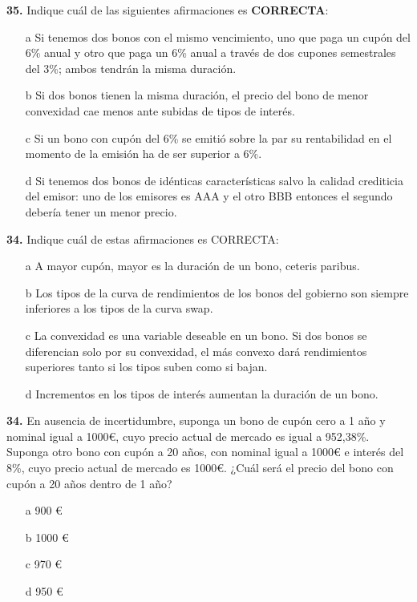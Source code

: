 \documentclass{nuevotema}
\begin{document}
\textbf{35.} Indique cuál de las siguientes afirmaciones es \textbf{CORRECTA}:
\begin{enumerate}
	\item[a] Si tenemos dos bonos con el mismo vencimiento, uno que paga un cupón del 6\% anual y otro que paga un 6\% anual a través de dos cupones semestrales del 3\%; ambos tendrán la misma duración.
	\item[b] Si dos bonos tienen la misma duración, el precio del bono de menor convexidad cae menos ante subidas de tipos de interés.
	\item[c] Si un bono con cupón del 6\% se emitió sobre la par su rentabilidad en el momento de la emisión ha de ser superior a 6\%.
	\item[d] Si tenemos dos bonos de idénticas características salvo la calidad crediticia del emisor: uno de los emisores es AAA y el otro BBB entonces el segundo debería tener un menor precio.
\end{enumerate}

\textbf{34.} Indique cuál de estas afirmaciones es CORRECTA:
\begin{enumerate}
	\item[a] A mayor cupón, mayor es la duración de un bono, ceteris paribus.
	\item[b] Los tipos de la curva de rendimientos de los bonos del gobierno son siempre inferiores a los tipos de la curva swap.
	\item[c] La convexidad es una variable deseable en un bono. Si dos bonos se diferencian solo por su convexidad, el más convexo dará rendimientos superiores tanto si los tipos suben como si bajan.
	\item[d] Incrementos en los tipos de interés aumentan la duración de un bono.
\end{enumerate}

\textbf{34.} En ausencia de incertidumbre, suponga un bono de cupón cero a 1 año y nominal igual a 1000€, cuyo precio actual de mercado es igual a 952,38\%. Suponga otro bono con cupón a 20 años, con nominal igual a 1000€ e interés del 8\%, cuyo precio actual de mercado es 1000€. ¿Cuál será el precio del bono con cupón a 20 años dentro de 1 año?
\begin{enumerate}
	\item[a] 900 €
	\item[b] 1000 €
	\item[c] 970 €
	\item[d] 950 €
\end{enumerate}
\end{document}
